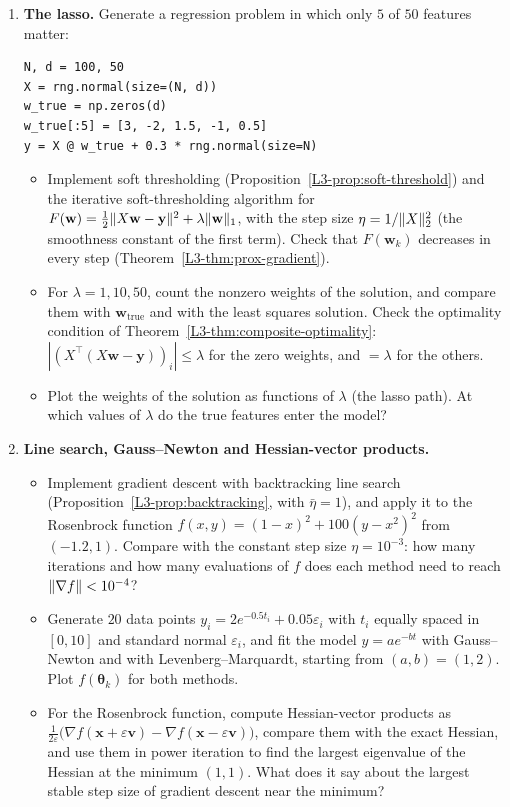 \begin{enumerate}[label=\textbf{P\arabic*.}, leftmargin=*]
    \item \homework{} \textbf{The lasso.} Generate a regression problem in which only $5$ of $50$ features matter:
\begin{lstlisting}
N, d = 100, 50
X = rng.normal(size=(N, d))
w_true = np.zeros(d)
w_true[:5] = [3, -2, 1.5, -1, 0.5]
y = X @ w_true + 0.3 * rng.normal(size=N)
\end{lstlisting}
    \begin{itemize}
        \item Implement soft thresholding (Proposition~\ref{L3-prop:soft-threshold}) and the iterative soft-thresholding algorithm for $F(\mathbf{w}) = \frac{1}{2}\lVert X\mathbf{w} - \mathbf{y} \rVert^2 + \lambda\lVert \mathbf{w} \rVert_1$, with the step size $\eta = 1/\lVert X \rVert_2^2$ (the smoothness constant of the first term). Check that $F(\mathbf{w}_k)$ decreases in every step (Theorem~\ref{L3-thm:prox-gradient}).
        \item For $\lambda = 1, 10, 50$, count the nonzero weights of the solution, and compare them with $\mathbf{w}_{\text{true}}$ and with the least squares solution. Check the optimality condition of Theorem~\ref{L3-thm:composite-optimality}: $|(X^\top(X\mathbf{w} - \mathbf{y}))_i| \leq \lambda$ for the zero weights, and $= \lambda$ for the others.
        \item Plot the weights of the solution as functions of $\lambda$ (the lasso path). At which values of $\lambda$ do the true features enter the model?
    \end{itemize}

    \item \textbf{Line search, Gauss--Newton and Hessian-vector products.}
    \begin{itemize}
        \item Implement gradient descent with backtracking line search (Proposition~\ref{L3-prop:backtracking}, with $\bar\eta = 1$), and apply it to the Rosenbrock function $f(x, y) = (1 - x)^2 + 100(y - x^2)^2$ from $(-1.2, 1)$. Compare with the constant step size $\eta = 10^{-3}$: how many iterations and how many evaluations of $f$ does each method need to reach $\lVert \nabla f \rVert < 10^{-4}$?
        \item Generate $20$ data points $y_i = 2e^{-0.5t_i} + 0.05\varepsilon_i$ with $t_i$ equally spaced in $[0, 10]$ and standard normal $\varepsilon_i$, and fit the model $y = ae^{-bt}$ with Gauss--Newton and with Levenberg--Marquardt, starting from $(a, b) = (1, 2)$. Plot $f(\boldsymbol{\theta}_k)$ for both methods.
        \item For the Rosenbrock function, compute Hessian-vector products as $\frac{1}{2\varepsilon}\big(\nabla f(\mathbf{x} + \varepsilon\mathbf{v}) - \nabla f(\mathbf{x} - \varepsilon\mathbf{v})\big)$, compare them with the exact Hessian, and use them in power iteration to find the largest eigenvalue of the Hessian at the minimum $(1, 1)$. What does it say about the largest stable step size of gradient descent near the minimum?
    \end{itemize}
\end{enumerate}
\endgroup
